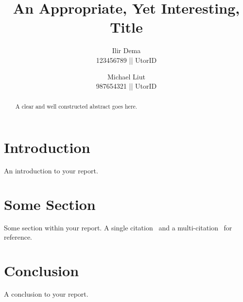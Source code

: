 \documentclass[sigconf]{acmart}
\begin{document}
\title{An Appropriate, Yet Interesting, Title}

\author{Ilir Dema\\123456789 || UtorID}

\author{Michael Liut\\987654321 || UtorID}

\renewcommand{\shortauthors}{Dema and Liut, et al.}


\begin{abstract}
  A clear and well constructed abstract goes here.
\end{abstract}




\maketitle

\section{Introduction}
An introduction to your report. \lipsum[2-4]

\section{Some Section}
Some section within your report. A single citation~\cite{dayarathna} and  
a multi-citation~\cite{dayarathna,tsirogiannis,flucker} for reference.

\lipsum[1]

\section{Conclusion}
A conclusion to your report. \lipsum[2-4]




\balance
\end{document}
